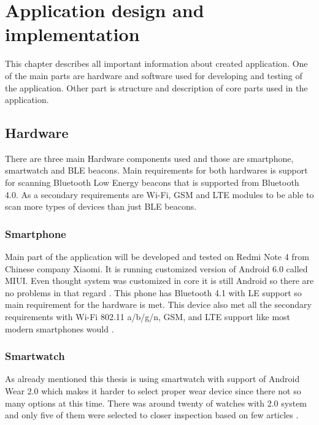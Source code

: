 \chapter{Application design and implementation}\label{sec:ApplicationDesingAndImplementation}
This chapter describes all important information about created application. One of the main parts are hardware and software used for developing and testing of the application. Other part is structure and description of core parts used in the application. 

\section{Hardware}\label{sec:Hardware}
There are three main Hardware components used and those are smartphone, smartwatch and BLE beacons. Main requirements for both hardwares is support for scanning Bluetooth Low Energy beacons that is supported from Bluetooth 4.0. As a secondary requirements are Wi-Fi, GSM and LTE modules to be able to scan more types of devices than just BLE beacons.  


\subsection{Smartphone}\label{subsec:Smartphone}
Main part of the application will be developed and tested on Redmi Note 4 from Chinese company Xiaomi. It is running customized version of Android 6.0 called MIUI. Even thought system was customized in core it is still Android so there are no problems in that regard  \cite{XRN4LTE}. This phone has Bluetooth 4.1 with LE support so main requirement for the hardware is met. This device also met all the secondary requirements with Wi-Fi 802.11 a/b/g/n, GSM, and LTE support like most modern smartphones would \cite{XRN4FPS}.

\subsection{Smartwatch}\label{subsec:Smartwatch}
As already mentioned this thesis is using smartwatch with support of Android Wear 2.0 which makes it harder to select proper wear device since there not so many options at this time. There was around twenty of watches with 2.0 system and only five of them were selected to closer inspection based on few articles \cite{BAWW, BAWW18, BAWW17}.

